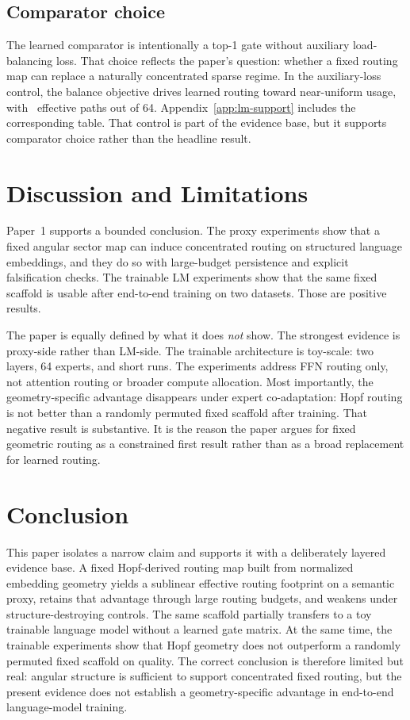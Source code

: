 \documentclass{article}
\begin{document}
\subsection{Comparator choice}
The learned comparator is intentionally a top-1 gate without auxiliary load-balancing loss. That choice reflects the paper's question: whether a fixed routing map can replace a naturally concentrated sparse regime. In the auxiliary-loss control, the balance objective drives learned routing toward near-uniform usage, with \PaperAuxSparseEff\ effective paths out of 64. Appendix~\ref{app:lm-support} includes the corresponding table. That control is part of the evidence base, but it supports comparator choice rather than the headline result.

\section{Discussion and Limitations}
Paper~1 supports a bounded conclusion. The proxy experiments show that a fixed angular sector map can induce concentrated routing on structured language embeddings, and they do so with large-budget persistence and explicit falsification checks. The trainable LM experiments show that the same fixed scaffold is usable after end-to-end training on two datasets. Those are positive results.

The paper is equally defined by what it does \emph{not} show. The strongest evidence is proxy-side rather than LM-side. The trainable architecture is toy-scale: two layers, 64 experts, and short runs. The experiments address FFN routing only, not attention routing or broader compute allocation. Most importantly, the geometry-specific advantage disappears under expert co-adaptation: Hopf routing is not better than a randomly permuted fixed scaffold after training. That negative result is substantive. It is the reason the paper argues for fixed geometric routing as a constrained first result rather than as a broad replacement for learned routing.

\section{Conclusion}
This paper isolates a narrow claim and supports it with a deliberately layered evidence base. A fixed Hopf-derived routing map built from normalized embedding geometry yields a sublinear effective routing footprint on a semantic proxy, retains that advantage through large routing budgets, and weakens under structure-destroying controls. The same scaffold partially transfers to a toy trainable language model without a learned gate matrix. At the same time, the trainable experiments show that Hopf geometry does not outperform a randomly permuted fixed scaffold on quality. The correct conclusion is therefore limited but real: angular structure is sufficient to support concentrated fixed routing, but the present evidence does not establish a geometry-specific advantage in end-to-end language-model training.
\end{document}
